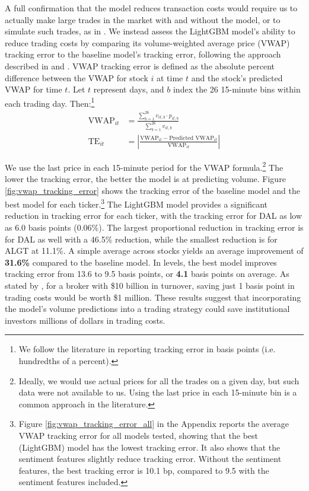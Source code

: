 \documentclass[12pt]{article}
\begin{document}
A full confirmation that the model reduces transaction costs would require us to actually make large trades in the market with and without the model, or to simulate such trades, as in \textcite{satish2014predicting}. We instead assess the LightGBM model's ability to reduce trading costs by comparing its volume-weighted average price (VWAP) tracking error to the baseline model's tracking error, following the approach described in \textcite{chen2016forecasting} and \textcite{cucuringu2025forecasting}. VWAP tracking error is defined as the absolute percent difference between the VWAP for stock $i$ at time $t$ and the stock's predicted VWAP for time $t$. Let $t$ represent days, and $b$ index the 26 15-minute bins within each trading day. Then:\footnote{We follow the literature in reporting tracking error in basis points (i.e. hundredths of a percent).}
\begin{align}
    \text{VWAP}_{it} &= \frac{\sum_{b=1}^{26} v_{it,b} \cdot p_{it,b}}{\sum_{b=1}^{26} v_{it,b}} \\
    \text{TE}_{it} &= \left| \frac{\text{VWAP}_{it} - \text{Predicted VWAP}_{it}}{\text{VWAP}_{it}} \right|
\end{align}

We use the last price in each 15-minute period for the VWAP formula.\footnote{Ideally, we would use actual prices for all the trades on a given day, but such data were not available to us. Using the last price in each 15-minute bin is a common approach in the literature.} The lower the tracking error, the better the model is at predicting volume. Figure \ref{fig:vwap_tracking_error} shows the tracking error of the baseline model and the best model for each ticker.\footnote{Figure \ref{fig:vwap_tracking_error_all} in the Appendix reports the average VWAP tracking error for all models tested, showing that the best (LightGBM) model has the lowest tracking error. It also shows that the sentiment features slightly reduce tracking error. Without the sentiment features, the best tracking error is 10.1 bp, compared to 9.5 with the sentiment features included.} The LightGBM model provides a significant reduction in tracking error for each ticker, with the tracking error for DAL as low as 6.0 basis points (0.06\%). The largest proportional reduction in tracking error is for DAL as well with a 46.5\% reduction, while the smallest reduction is for ALGT at 11.1\%. A simple average across stocks yields an average improvement of \textbf{31.6\%} compared to the baseline model. In levels, the best model improves tracking error from 13.6 to 9.5 basis points, or \textbf{4.1} basis points on average. As stated by \textcite{chen2016forecasting}, for a broker with \$10 billion in turnover, saving just 1 basis point in trading costs would be worth \$1 million. These results suggest that incorporating the model's volume predictions into a trading strategy could save institutional investors millions of dollars in trading costs.
\end{document}
